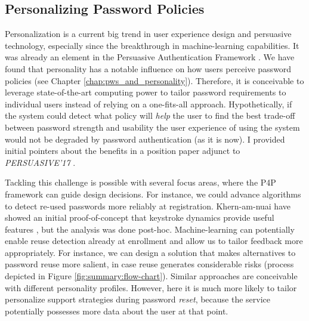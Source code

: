 \subsection{Personalizing Password Policies}\label{sec:pst:personalizing-policies}
Personalization is a current big trend in user experience design and persuasive technology, especially since the breakthrough in machine-learning capabilities. It was already an element in the Persuasive Authentication Framework \cite{Forget2007PersuasionEducationSecurity}. We have found that personality has a notable influence on how users perceive password policies (see Chapter \ref{chap:pws_and_personality}). Therefore, it is conceivable to leverage state-of-the-art computing power to tailor password requirements to individual users instead of relying on a one-fits-all approach. Hypothetically, if the system could detect what policy will \textit{help} the user to find the best trade-off between password strength and usability the user experience of using the system would not be degraded by password authentication (as it is now). I provided initial pointers about the benefits in a position paper adjunct to \textit{PERSUASIVE'17} \cite{Seitz2017PersonalizingPasswordPolicies}. 

Tackling this challenge is possible with several focus areas, where the P4P framework can guide design decisions. For instance, we could advance algorithms to detect re-used passwords more reliably at registration. Khern-am-nuai \etal have showed an initial proof-of-concept that keystroke dynamics provide useful features \cite{Khern-am-nuai2017Journal}, but the analysis was done post-hoc. Machine-learning can potentially enable reuse detection already at enrollment and allow us to tailor feedback more appropriately. For instance, we can design a solution that makes alternatives to password reuse more salient, in case reuse generates considerable risks (process depicted in Figure \ref{fig:summary:flow-chart}). Similar approaches are conceivable with different personality profiles. However, here it is much more likely to tailor personalize support strategies during password \textit{reset}, because the service potentially possesses more data about the user at that point. 

